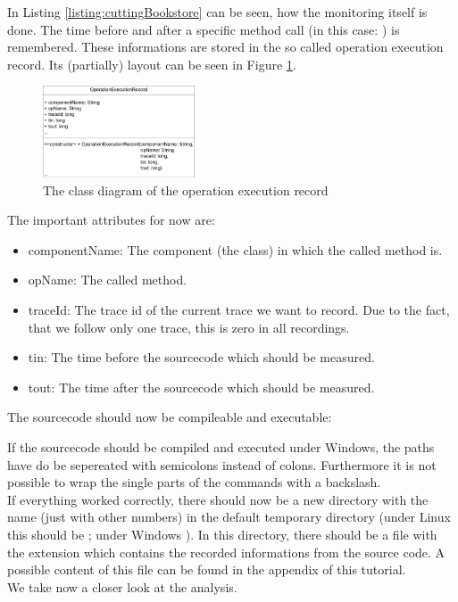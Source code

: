 		In Listing \ref{listing:cuttingBookstore}  can be seen, how the monitoring itself is done. The time before and after a specific method call (in this case: ) is remembered. These informations are stored in the so called operation execution record. Its (partially) layout can be seen in Figure \ref{Figure:OperationExecutionRecordClassDiagram}.

		\begin{figure}[H]
			\begin{centering}
				\includegraphics[width=0.4\textwidth]{images/OpExRecClassDiagram}
				\caption{The class diagram of the operation execution record}
				\label{Figure:OperationExecutionRecordClassDiagram}
			\end{centering}
		\end{figure}

		The important attributes for now are:
		\begin{itemize}
			\item componentName: The component (the class) in which the called method is.
			\item opName: The called method.
			\item traceId: The trace id of the current trace we want to record. Due to the fact, that we follow only one trace, this is zero in all recordings.
			\item tin: The time before the sourcecode which should be measured.
			\item tout: The time after the sourcecode which should be measured.
		\end{itemize}
		The sourcecode should now be compileable and executable:

		\setBashListing 		
					

		\warning If the sourcecode should be compiled and executed under Windows, the paths have do be sepereated with semicolons instead of colons. Furthermore it is not possible to wrap the single parts of the commands with a backslash.\\
		If everything worked correctly, there should now be a new directory with the name  (just with other numbers) in the default temporary directory (under Linux this should be ; under Windows ). In this directory, there should be a file with the extension  which contains the recorded informations from the source code. A possible content of this file can be found in the appendix of this tutorial.\\
		We take now a closer look at the analysis.

